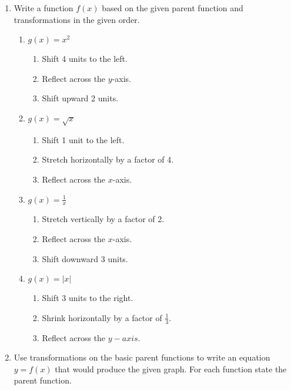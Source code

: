 \begin{enumerate}
\item Write a function $f(x)$ based on the given parent function and transformations in the given order.
\begin{enumerate}
\item $g(x)=x^2$ 
\begin{enumerate}
\item Shift 4 units to the left.
\item Reflect across the $y$-axis.
\item Shift upward 2 units.
\end{enumerate}

\vspace{1in}


\item $g(x)=\sqrt{x}$
\begin{enumerate}
\item Shift 1 unit to the left.
\item Stretch horizontally by a factor of 4.
\item Reflect across the $x$-axis.
\end{enumerate}

\vspace{1in}

\item $\displaystyle g(x)=\frac{1}{x}$
\begin{enumerate}
\item Stretch vertically by a factor of 2.
\item Reflect across the $x$-axis.
\item Shift downward 3 units.
\end{enumerate}

\vspace{1in}

\item $\displaystyle g(x)=|x|$
\begin{enumerate}
\item Shift 3 units to the right.
\item Shrink horizontally by a factor of $\displaystyle \frac{1}{3}$.
\item Reflect across the $y-axis$.
\end{enumerate}

\vspace{1in}

\end{enumerate}

\vfill
\clearpage


\item Use transformations on the basic parent functions to write an
  equation $y=f(x)$ that would produce the given graph. For each
  function state the parent function.


\end{enumerate}

